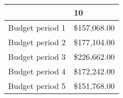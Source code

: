 \begin{tabular}{ll}
\hline
{} &           10 \\
\hline
Budget period 1 &  \$157,068.00 \\
Budget period 2 &  \$177,104.00 \\
Budget period 3 &  \$226,662.00 \\
Budget period 4 &  \$172,242.00 \\
Budget period 5 &  \$151,768.00 \\
\hline
\end{tabular}
